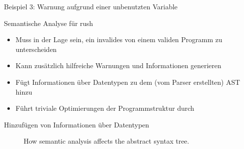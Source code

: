 \begin{frame}{Beispiel 3: Warnung aufgrund einer unbenutzten Variable}
	\begin{minipage}{.5\textwidth}
	\end{minipage}%
	\begin{minipage}{.5\textwidth}
	\end{minipage}
\end{frame}

\begin{frame}{Semantische Analyse für rush}
	\begin{itemize}
		\item Muss in der Lage sein, ein invalides von einem validen Programm zu unterscheiden
		\item Kann zusätzlich hilfreiche Warnungen und Informationen generieren
		\item Fügt Informationen über Datentypen zu dem (vom Parser erstellten) AST hinzu
		\item Führt triviale Optimierungen der Programmstruktur durch
	\end{itemize}
\end{frame}

\begin{frame}{Hinzufügen von Informationen über Datentypen}

	\begin{figure}[h]
		\begin{adjustbox}{max totalsize={\textwidth}{!},center}
        \end{adjustbox}
		\caption{How semantic analysis affects the abstract syntax tree.}\label{fig:analysis_tree_conv}
	\end{figure}
\end{frame}
